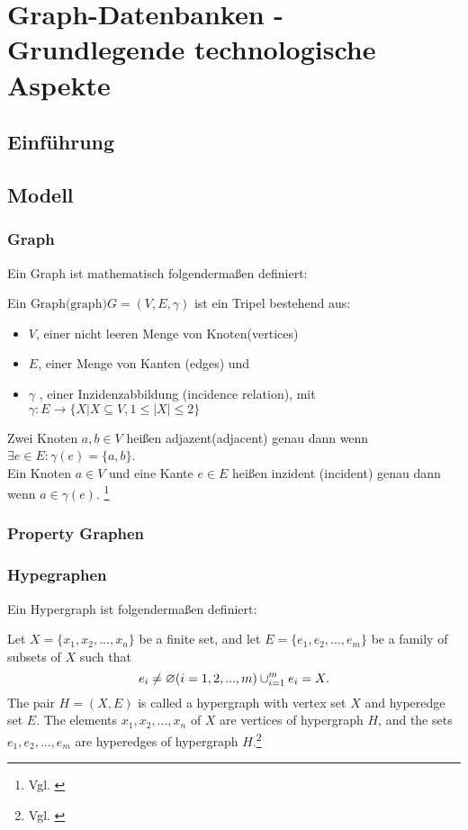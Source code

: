 \chapter{Graph-Datenbanken - Grundlegende technologische Aspekte}
\section{Einführung}
\section{Modell}
\subsection{Graph}
Ein Graph ist mathematisch folgendermaßen definiert: \\
\begin{definition}
	Ein $\text{Graph(graph)}G=(V,E,\gamma)$ ist ein Tripel bestehend aus:
	\begin{itemize}
		\item $V$, einer nicht leeren Menge von Knoten(vertices)
		\item $E$, einer Menge von Kanten (edges) und
		\item $\gamma$ , einer Inzidenzabbildung (incidence relation), mit\\
		$\gamma : E \longrightarrow \{X | X \subseteq V, 1 \leq |X| \leq 2\}$
	\end{itemize}
	Zwei Knoten $a,b \in V$ heißen adjazent(adjacent) genau dann wenn
	$\exists e \in E: \gamma(e)=\{a,b\}$. \\
	Ein Knoten $a \in V$ und eine Kante $e \in E$ heißen inzident (incident)
	genau dann wenn $a \in \gamma(e)$. \footnote{Vgl. \cite[Seite 21]{pbeck01}}
\end{definition}
\subsection{Property Graphen}
\subsection{Hypegraphen}
Ein Hypergraph ist folgendermaßen definiert:
\begin{definition}
	Let $X=\{x_{1}, x_{2},...,x_{n}\}$ be a finite set,
	and let $E=\{e_{1},e_{2},...,e_{m}\}$ be a family of subsets of $X$ such that
	\[e_{i} \neq \varnothing (i=1,2,...,m) \\
	\cup_{i=1}^{m}e_{i}=X.
	\]
	The pair $H=(X,E)$ is called a hypergraph with vertex set $X$
	and hyperedge set $E$. The elements $x_{1}, x_{2},...,x_{n}$ of $X$ are vertices
	of hypergraph $H$, and the sets $e_{1}, e_{2},...,e_{m}$ are hyperedges of hypergraph $H$.\footnote{Vgl. \cite[Seite 2]{zhang2018hypergraph}}
\end{definition}
